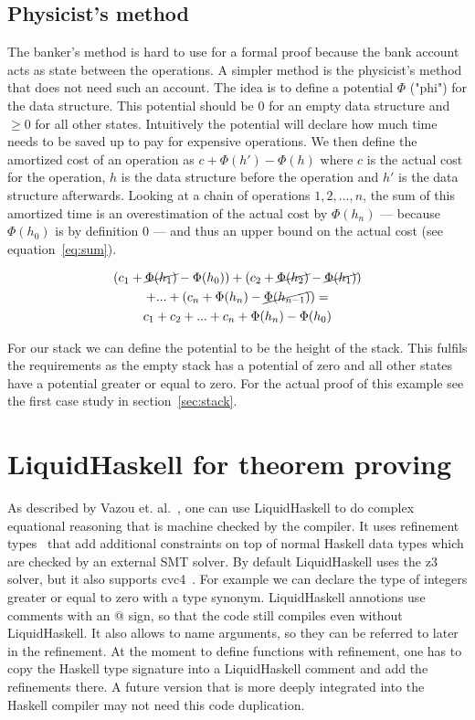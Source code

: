 \documentclass[sigplan,screen]{acmart}
\begin{document}
\subsection{Physicist's method}\label{sec:physicist}

The banker's method is hard to use for a formal proof because the bank account acts as state between the operations. A simpler method is the physicist's method that does not need such an account. The idea is to define a potential $\Phi$ ("phi") for the data structure. This potential should be $0$ for an empty data structure and $\ge 0$ for all other states. Intuitively the potential will declare how much time needs to be saved up to pay for expensive operations. We then define the amortized cost of an operation as $c + \Phi(h') - \Phi(h)$ where $c$ is the actual cost for the operation, $h$ is the data structure before the operation and $h'$ is the data structure afterwards. Looking at a chain of operations $1, 2, ..., n$, the sum of this amortized time is an overestimation of the actual cost by $\Phi(h_n)$ --- because $\Phi(h_0)$ is by definition $0$ --- and thus an upper bound on the actual cost (see equation~\ref{eq:sum}).

\begin{gather}
\nonumber (c_1 + \cancel{\Phi(h_1)} - \Phi(h_0)) + (c_2 + \cancel{\Phi(h_2)} - \cancel{\Phi(h_1)}) \\
\nonumber    + ... + (c_n + \Phi(h_n) - \cancel{\Phi(h_{n - 1})}) = \\
  c_1 + c_2 + ... + c_n + \Phi(h_n) - \Phi(h_0) \label{eq:sum}
\end{gather}

For our stack we can define the potential to be the height of the stack. This fulfils the requirements as the empty stack has a potential of zero and all other states have a potential greater or equal to zero. For the actual proof of this example see the first case study in section~\ref{sec:stack}.

\section{LiquidHaskell for theorem proving}

As described by Vazou et. al.~\cite{tpfa}, one can use LiquidHaskell to do complex equational reasoning that is machine checked by the compiler. It uses refinement types~\cite{refinement_types} that add additional constraints on top of normal Haskell data types which are checked by an external SMT solver. By default LiquidHaskell uses the z3~\cite{z3} solver, but it also supports cvc4~\cite{cvc4}. For example we can declare the type of integers greater or equal to zero with a type synonym. LiquidHaskell annotions use comments with an @ sign, so that the code still compiles even without LiquidHaskell. It also allows to name arguments, so they can be referred to later in the refinement. At the moment to define functions with refinement, one has to copy the Haskell type signature into a LiquidHaskell comment and add the refinements there. A future version that is more deeply integrated into the Haskell compiler may not need this code duplication.
\end{document}
